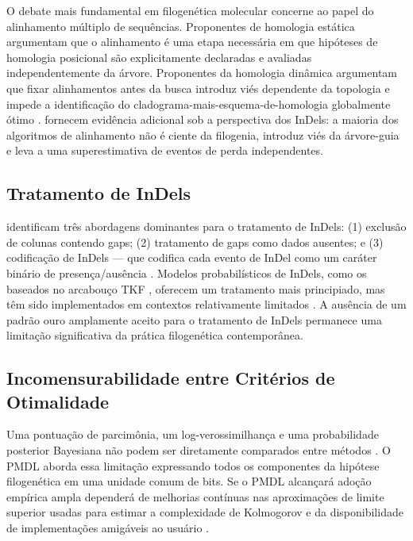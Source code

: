 O debate mais fundamental em filogenética molecular concerne ao papel do alinhamento múltiplo de sequências. Proponentes de homologia estática argumentam que o alinhamento é uma etapa necessária em que hipóteses de homologia posicional são explicitamente declaradas e avaliadas independentemente da árvore. Proponentes da homologia dinâmica argumentam que fixar alinhamentos antes da busca introduz viés dependente da topologia e impede a identificação do cladograma-mais-esquema-de-homologia globalmente ótimo \parencite{wheeleretal2006}. \textcite{redelings2024} fornecem evidência adicional sob a perspectiva dos InDels: a maioria dos algoritmos de alinhamento não é ciente da filogenia, introduz viés da árvore-guia e leva a uma superestimativa de eventos de perda independentes.

\subsection{Tratamento de InDels}

\textcite{redelings2024} identificam três abordagens dominantes para o tratamento de InDels: (1) exclusão de colunas contendo gaps; (2) tratamento de gaps como dados ausentes; e (3) codificação de InDels --- que codifica cada evento de InDel como um caráter binário de presença/ausência \parencite{simmons2007}. Modelos probabilísticos de InDels, como os baseados no arcabouço TKF \parencite{thornekishinofelsenstein1991}, oferecem um tratamento mais principiado, mas têm sido implementados em contextos relativamente limitados \parencite{redelings2024}. A ausência de um padrão ouro amplamente aceito para o tratamento de InDels permanece uma limitação significativa da prática filogenética contemporânea.

\subsection{Incomensurabilidade entre Critérios de Otimalidade}

Uma pontuação de parcimônia, um log-verossimilhança e uma probabilidade posterior Bayesiana não podem ser diretamente comparados entre métodos \parencite{wheelervaron2025}. O PMDL aborda essa limitação expressando todos os componentes da hipótese filogenética em uma unidade comum de bits. Se o PMDL alcançará adoção empírica ampla dependerá de melhorias contínuas nas aproximações de limite superior usadas para estimar a complexidade de Kolmogorov e da disponibilidade de implementações amigáveis ao usuário \parencite{wheelervaron2025}.

